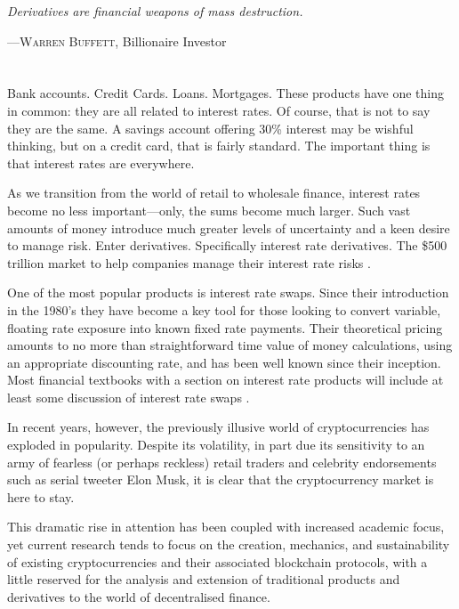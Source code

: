 \epigraph{\textit{Derivatives are financial weapons of mass destruction.}}{––\textsc{Warren Buffett}, Billionaire Investor}

\section*{}

Bank accounts. Credit Cards. Loans. Mortgages. These products have one thing in common: they are all related to interest rates. Of course, that is not to say they are the same. A savings account offering 30\% interest may be wishful thinking, but on a credit card, that is fairly standard. The important thing is that interest rates are everywhere. 

As we transition from the world of retail to wholesale finance, interest rates become no less important––only, the sums become much larger. Such vast amounts of money introduce much greater levels of uncertainty and a keen desire to manage risk. Enter derivatives. Specifically interest rate derivatives. The \$500 trillion market to help companies manage their interest rate risks \citep{BIS_Ch2_1}.

One of the most popular products is interest rate swaps. Since their introduction in the 1980's they have become a key tool for those looking to convert variable, floating rate exposure into known fixed rate payments. Their theoretical pricing amounts to no more than straightforward time value of money calculations, using an appropriate discounting rate, and has been well known since their inception. Most financial textbooks with a section on interest rate products will include at least some discussion of interest rate swaps \citep{sadr2009interest}  \citep{flavell2012swaps} \citep{wilmott2013paul} \citep{veronesi2016handbook}.

In recent years, however, the previously illusive world of cryptocurrencies has exploded in popularity. Despite its volatility, in part due its sensitivity to an army of fearless (or perhaps reckless) retail traders and celebrity endorsements such as serial tweeter Elon Musk, it is clear that the cryptocurrency market is here to stay. 

This dramatic rise in attention has been coupled with increased academic focus, yet current research tends to focus on the creation, mechanics, and sustainability of existing cryptocurrencies and their associated blockchain protocols, with a little reserved for the analysis and extension of traditional products and derivatives to the world of decentralised finance. 

